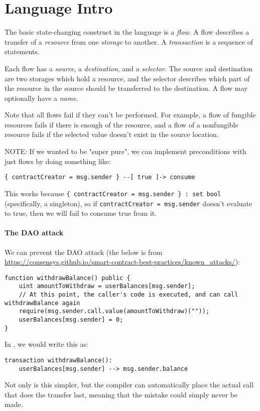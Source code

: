 \documentclass[10pt]{article}
\begin{document}
\section{Language Intro}

The basic state-changing construct in the language is a \emph{flow}.
A flow describes a transfer of a \emph{resource} from one \emph{storage} to another.
A \emph{transaction} is a sequence of statements.

Each flow has a \emph{source}, a \emph{destination}, and a \emph{selector}.
The source and destination are two storages which hold a resource, and the selector describes which part of the resource in the source should be transferred to the destination.
A flow may optionally have a \emph{name}.

Note that all flows fail if they can't be performed.
For example, a flow of fungible resources fails if there is enough of the resource, and a flow of a nonfungible resource fails if the selected value doesn't exist in the source location.

NOTE: If we wanted to be "super pure", we can implement preconditions with just flows by doing something like:
\begin{lstlisting}
{ contractCreator = msg.sender } --[ true ]-> consume
\end{lstlisting}
This works because \lstinline|{ contractCreator = msg.sender } : set bool| (specifically, a singleton), so if \lstinline{contractCreator = msg.sender} doesn't evaluate to true, then we will fail to consume true from it.

\paragraph{The DAO attack}
We can prevent the DAO attack (the below is from \url{https://consensys.github.io/smart-contract-best-practices/known_attacks/}):
\begin{lstlisting}
function withdrawBalance() public {
    uint amountToWithdraw = userBalances[msg.sender];
    // At this point, the caller's code is executed, and can call withdrawBalance again
    require(msg.sender.call.value(amountToWithdraw)(""));
    userBalances[msg.sender] = 0;
}
\end{lstlisting}

In \langName, we would write this as:

\begin{lstlisting}
transaction withdrawBalance():
    userBalances[msg.sender] --> msg.sender.balance
\end{lstlisting}

Not only is this simpler, but the compiler can automatically place the actual call that does the transfer last, meaning that the mistake could simply never be made.
\end{document}
